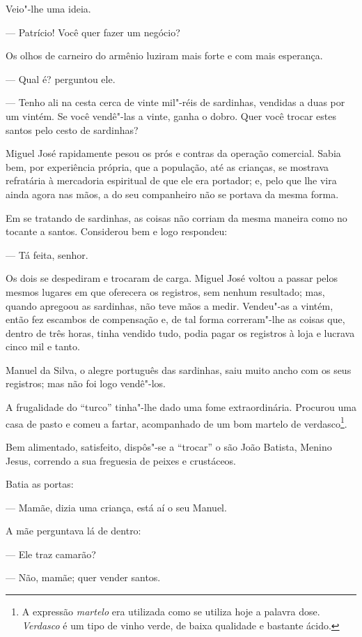 Veio"-lhe uma ideia.

--- Patrício! Você quer fazer um negócio?

Os olhos de carneiro do armênio luziram mais forte e com mais esperança.

--- Qual é? perguntou ele.

--- Tenho ali na cesta cerca de vinte mil"-réis de sardinhas, vendidas a
duas por um vintém. Se você vendê"-las a vinte, ganha o dobro. Quer você
trocar estes santos pelo cesto de sardinhas?

Miguel José rapidamente pesou os prós e contras da operação comercial.
Sabia bem, por experiência própria, que a população, até as crianças, se
mostrava refratária à mercadoria espiritual de que ele era portador; e,
pelo que lhe vira ainda agora nas mãos, a do seu companheiro não se
portava da mesma forma.

Em se tratando de sardinhas, as coisas não corriam da mesma maneira como
no tocante a santos. Considerou bem e logo respondeu:

--- Tá feita, senhor.

Os dois se despediram e trocaram de carga. Miguel José voltou a passar
pelos mesmos lugares em que oferecera os registros, sem nenhum
resultado; mas, quando apregoou as sardinhas, não teve mãos a medir.
Vendeu"-as a vintém, então fez escambos de compensação e, de tal forma
correram"-lhe as coisas que, dentro de três horas, tinha vendido tudo,
podia pagar os registros à loja e lucrava cinco mil e tanto.

Manuel da Silva, o alegre português das sardinhas, saiu muito ancho com
os seus registros; mas não foi logo vendê"-los.

A frugalidade do ``turco'' tinha"-lhe dado uma fome extraordinária.
Procurou uma casa de pasto e comeu a fartar, acompanhado de um bom
martelo de verdasco\footnote{A expressão \emph{martelo} era utilizada
  como se utiliza hoje a palavra dose. \emph{Verdasco} é um tipo de
  vinho verde, de baixa qualidade e bastante ácido.}.

Bem alimentado, satisfeito, dispôs"-se a ``trocar'' o são João Batista,
Menino Jesus, correndo a sua freguesia de peixes e crustáceos.

Batia as portas:

--- Mamãe, dizia uma criança, está aí o seu Manuel.

A mãe perguntava lá de dentro:

--- Ele traz camarão?

--- Não, mamãe; quer vender santos.

